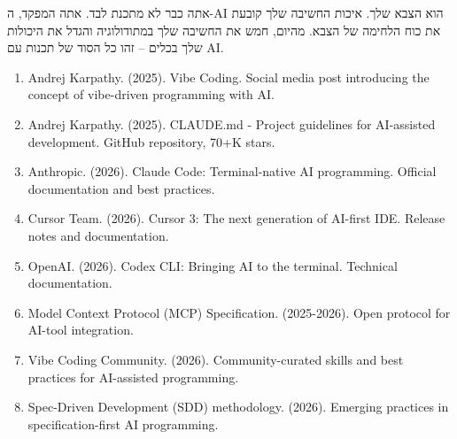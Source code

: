 אתה כבר לא מתכנת לבד. אתה המפקד, ה-AI הוא הצבא שלך. איכות החשיבה שלך קובעת את כוח הלחימה של הצבא. מהיום, חמש את החשיבה שלך במתודולוגיה והגדל את היכולות שלך בכלים – זהו כל הסוד של תכנות עם AI.


\begin{enumerate}
  \item Andrej Karpathy. (2025). Vibe Coding. Social media post introducing the concept of vibe-driven programming with AI.
  \item Andrej Karpathy. (2025). CLAUDE.md - Project guidelines for AI-assisted development. GitHub repository, 70+K stars.
  \item Anthropic. (2026). Claude Code: Terminal-native AI programming. Official documentation and best practices.
  \item Cursor Team. (2026). Cursor 3: The next generation of AI-first IDE. Release notes and documentation.
  \item OpenAI. (2026). Codex CLI: Bringing AI to the terminal. Technical documentation.
  \item Model Context Protocol (MCP) Specification. (2025-2026). Open protocol for AI-tool integration.
  \item Vibe Coding Community. (2026). Community-curated skills and best practices for AI-assisted programming.
  \item Spec-Driven Development (SDD) methodology. (2026). Emerging practices in specification-first AI programming.
\end{enumerate}
